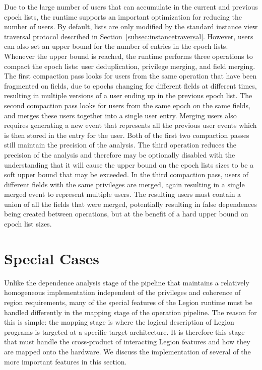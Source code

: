 Due to the large number of users that can 
accumulate in the current and previous epoch
lists, the runtime supports an important optimization
for reducing the number of users. By default,
lists are only modified by the standard instance view
traversal protocol described in 
Section~\ref{subsec:instancetraversal}. However, users
can also set an upper bound for the number of entries
in the epoch lists. Whenever the upper bound is reached,
the runtime performs three operations to compact the
epoch lists: user deduplication, privilege merging,
and field merging. The first compaction pass looks
for users from the same operation that have been 
fragmented on fields, due to epochs changing for different
fields at different times, resulting in multiple
versions of a user ending up in the previous epoch list.
The second compaction pass looks for users from the
same epoch on the same fields, and merges these users
together into a single user entry. Merging users also
requires generating a new event that represents all
the previous user events which is then stored in the
entry for the user.  Both of the first two compaction
passes still maintain the precision of the 
analysis.  The third operation reduces the precision
of the analysis and therefore may be optionally disabled
with the understanding that it will cause the upper
bound on the epoch lists sizes to be a soft upper
bound that may be exceeded.  In the third
compaction pass, users of different fields with the
same privileges are merged, again resulting in a single
merged event to represent multiple users. The resulting
users must contain a union of all the fields that 
were merged, potentially resulting in false dependences
being created between operations, but at the benefit
of a hard upper bound on epoch list sizes.

\section{Special Cases}
\label{sec:physicalcases}
Unlike the dependence analysis stage of the pipeline
that maintains a relatively homogeneous implementation
independent of the privileges and coherence of
region requirements, many of the special features of 
the Legion runtime must be handled differently in the 
mapping stage of the operation pipeline.
The reason for this is simple: the mapping stage 
is where the logical description of Legion programs
is targeted at a specific target architecture. It is 
therefore this stage that must handle the cross-product 
of interacting Legion features and how they are mapped
onto the hardware.  We discuss the implementation of
several of the more important features in this section.

